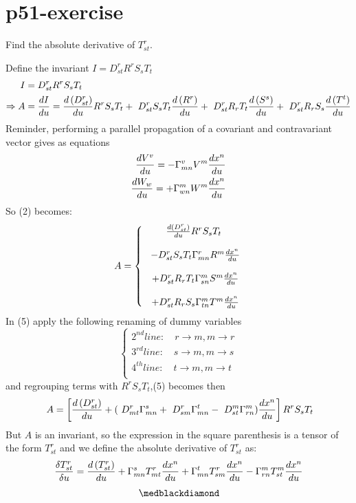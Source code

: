 \section{p51-exercise}
\begin{tcolorbox}
Find the absolute derivative of $T^r_{st}$.
\end{tcolorbox}
Define the invariant $ I = D^r_{st}R^rS_sT_t$ 
\begin{align}
\ I &= D^r_{st}R^rS_sT_t\\
\Rightarrow A &= \dv{I}{u}= 
\dv{\left(D^r_{st}\right)}{u}R^rS_sT_t+
\ D^r_{st}S_sT_t\dv{\left(R^r\right)}{u}+
\ D^r_{st}R_rT_t\dv{\left(S^s\right)}{u}+
\ D^r_{st}R_rS_s\dv{\left(T^t\right)}{u}
\end{align} 
Reminder, performing a parallel propagation of a covariant and contravariant vector gives as equations
\begin{align}
\dv{V^v}{u} = - \Gamma^v_{mn}V^m\dv{x^n}{u}\\
\dv{W_w}{u} = + \Gamma^m_{wn}W^m\dv{x^n}{u}
\end{align}
So (2) becomes:
\begin{align}
\ A = \left\{ \begin{array}{c}
\dv{\left(D^r_{st}\right)}{u}R^rS_sT_t\\\\
\ -D^r_{st}S_sT_t\Gamma^r_{mn}R^m\dv{x^n}{u}\\\\
\ +D^r_{st}R_rT_t \Gamma^m_{sn}S^m\dv{x^n}{u}\\\\
\ +D^r_{st}R_rS_s\Gamma^m_{tn}T^m\dv{x^n}{u}
\end{array} \right.
\end{align}
In (5) apply the following renaming of dummy variables 
$$\left\{\begin{array}{c}
2^{nd} line: \quad r\rightarrow m, m \rightarrow r\\
3^{rd} line: \quad s\rightarrow m, m \rightarrow s\\
4^{th} line: \quad t\rightarrow m, m \rightarrow t\\
\end{array}  \right. $$
and regrouping terms with $R^rS_sT_t$,(5) becomes then
\begin{align}
\ A = \left[\dv{\left(D^r_{st}\right)}{u}+(\ D^r_{mt}\Gamma^s_{mn}+\ D^r_{sm}\Gamma^t_{mn}-\ D^m_{st}\Gamma^m_{rn})\dv{x^n}{u}\right]R^rS_sT_t
\end{align}
But $A$ is an invariant, so the expression in the square parenthesis is a tensor of the form $T^r_{st}$ and we define the absolute derivative of $T^r_{st}$ as:
$$ \frac{\delta T^r_{st}}{\delta u} = \dv{\left(T^r_{st}\right)}{u}+\Gamma^s_{mn} T^r_{mt}\dv{x^n}{u}+\Gamma^t_{mn}T^r_{sm}\dv{x^n}{u}-\Gamma^m_{rn} T^m_{st}\dv{x^n}{u}$$
$$\medblackdiamond$$
\newpage

